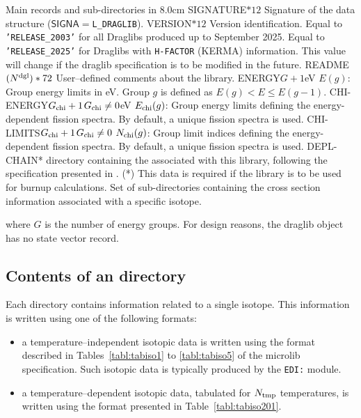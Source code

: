 \begin{DescriptionEnregistrement}{Main records and sub-directories in }{8.0cm}
\CharEnr
  {SIGNATURE}{$*12$}
  {Signature of the data structure ($\mathsf{SIGNA}=${\tt L\_DRAGLIB}).}
\CharEnr
  {VERSION}{$*12$}
  {Version identification. Equal to {\tt 'RELEASE\_2003'} for all Draglibs produced up to September
  2025. Equal to {\tt 'RELEASE\_2025'} for Draglibs with {\tt H-FACTOR} (KERMA) information. This value
  will change if the {\sc draglib} specification is to be modified in the future.}
\CharEnr
  {README}{$(N^{\rm dgl})*72$}
  {User--defined comments about the library.}
\RealEnr
  {ENERGY}{$G+1$}{eV}
  {$E(g)$: Group energy limits in eV. Group $g$ is defined as $E(g) < E \le E(g-1)$.}
\OptRealEnr
  {CHI-ENERGY}{$G_{\rm chi}+1$}{$G_{\rm chi}\ne 0$}{eV}
  {$E_{\rm chi}(g)$: Group energy limits defining the energy-dependent fission spectra. By default, a unique fission spectra is used.}
\OptIntEnr
  {CHI-LIMITS}{$G_{\rm chi}+1$}{$G_{\rm chi}\ne 0$}
  {$N_{\rm chi}(g)$: Group limit indices defining the energy-dependent fission spectra. By default, a unique fission spectra is used.}
\OptDirEnr
  {DEPL-CHAIN}{*}
  {directory containing the  associated with this library, following
  the specification presented in . (*) This data is required
  if the library is to be used for burnup calculations.}
\DirVar
  {}
  {Set of sub-directories containing the cross section information
   associated with a specific isotope.}
\end{DescriptionEnregistrement}

\noindent where $G$ is the number of energy groups. For design reasons, the
{\sc draglib} object has no state vector record.

\subsection{Contents of an  directory}\label{sect:isotopeDrag}

Each  directory contains information related to a single isotope.
This information is written using one of the following formats:
\begin{itemize}
\item a temperature--independent isotopic data is written using the format described
in Tables~\ref{tabl:tabiso1} to \ref{tabl:tabiso5} of the {\sc microlib}
specification. Such isotopic data is typically produced by the {\tt EDI:} module.
\item a temperature--dependent isotopic data, tabulated for $N_{\rm tmp}$ temperatures, is
written using the format presented in Table~\ref{tabl:tabiso201}.
\end{itemize}

